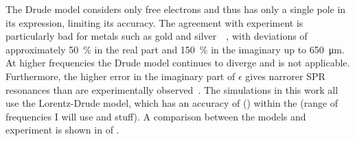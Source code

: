 The Drude model considers only free electrons and thus has only a single
pole in its expression, limiting its accuracy.  The agreement with
experiment is particularly bad for metals such as gold and
silver~\cite{ahmedcomputational}~\cite{jahanshahi2014study}, with
deviations of approximately \SI{50}{\percent} in the real part and
\SI{150}{\percent} in the imaginary up to \SI{650}{\micro\meter}.  At
higher frequencies the Drude model continues to diverge and is not
applicable.  Furthermore, the higher error in the imaginary part of
$\epsilon$ gives narrorer SPR resonances than are experimentally
observed~\cite{jahanshahi2014study}.  The simulations in this work all use
the Lorentz-Drude model, which has an accuracy of () within the (range of
frequencies I will use and stuff).  A comparison between the models and
experiment is shown in  of
.
